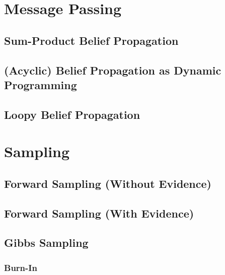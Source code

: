 
	\section{Message Passing} %

		\subsection{Sum-Product Belief Propagation} %

		\subsection{(Acyclic) Belief Propagation as Dynamic Programming} %

		\subsection{Loopy Belief Propagation} %

	\section{Sampling} %

		\subsection{Forward Sampling (Without Evidence)} %

		\subsection{Forward Sampling (With Evidence)} %

		\subsection{Gibbs Sampling} %

			\subsubsection{Burn-In} %

